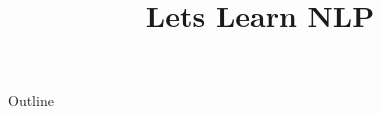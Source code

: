 \documentclass[xcolor=dvipsnames,compress,t,pdf,9pt]{beamer}
\title[\insertframenumber /\inserttotalframenumber]{Lets Learn NLP}
\begin{document}
	\begin{frame}
	\titlepage
	\end{frame}
	
	\begin{frame}{Outline}
	    \tableofcontents
	\end{frame}

	
	
	
	
\end{document}
